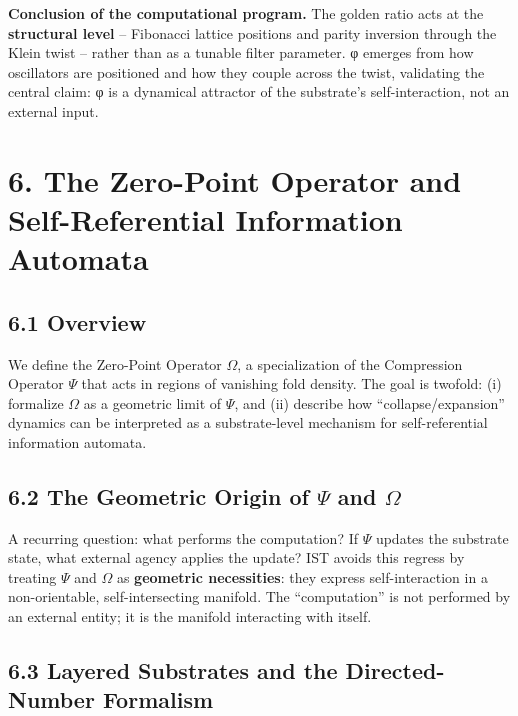 \documentclass[
  11pt,
]{article}
\begin{document}
\textbf{Conclusion of the computational program.} The golden ratio acts
at the \textbf{structural level} -- Fibonacci lattice positions and
parity inversion through the Klein twist -- rather than as a tunable
filter parameter. φ emerges from how oscillators are positioned and how
they couple across the twist, validating the central claim: φ is a
dynamical attractor of the substrate's self-interaction, not an external
input.

\section{6. The Zero-Point Operator and Self-Referential Information
Automata}\label{the-zero-point-operator-and-self-referential-information-automata}

\subsection{6.1 Overview}\label{overview-2}

We define the Zero-Point Operator \(\Omega\), a specialization of the
Compression Operator \(\Psi\) that acts in regions of vanishing fold
density. The goal is twofold: (i) formalize \(\Omega\) as a geometric
limit of \(\Psi\), and (ii) describe how ``collapse/expansion'' dynamics
can be interpreted as a substrate-level mechanism for self-referential
information automata.

\subsection{\texorpdfstring{6.2 The Geometric Origin of \(\Psi\) and
\(\Omega\)}{6.2 The Geometric Origin of \textbackslash Psi and \textbackslash Omega}}\label{the-geometric-origin-of-psi-and-omega}

A recurring question: what performs the computation? If \(\Psi\) updates
the substrate state, what external agency applies the update? IST avoids
this regress by treating \(\Psi\) and \(\Omega\) as \textbf{geometric
necessities}: they express self-interaction in a non-orientable,
self-intersecting manifold. The ``computation'' is not performed by an
external entity; it is the manifold interacting with itself.

\subsection{6.3 Layered Substrates and the Directed-Number
Formalism}\label{layered-substrates-and-the-directed-number-formalism}
\end{document}
